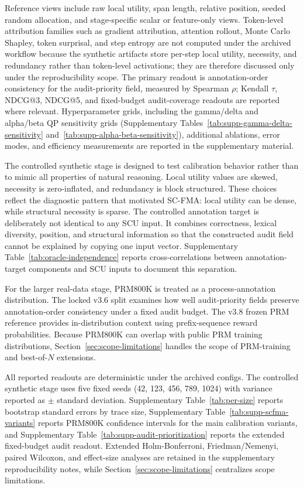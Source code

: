 \documentclass[a4paper,fleqn]{cas-sc}
\begin{document}
Reference views include raw local utility, span length, relative position, seeded random allocation, and stage-specific scalar or feature-only views. Token-level attribution families such as gradient attribution, attention rollout, Monte Carlo Shapley, token surprisal, and step entropy are not computed under the archived workflow because the synthetic artifacts store per-step local utility, necessity, and redundancy rather than token-level activations; they are therefore discussed only under the reproducibility scope. The primary readout is annotation-order consistency for the audit-priority field, measured by Spearman $\rho$; Kendall $\tau$, NDCG@3, NDCG@5, and fixed-budget audit-coverage readouts are reported where relevant. Hyperparameter grids, including the gamma/delta and alpha/beta QP sensitivity grids (Supplementary Tables~\ref{tab:supp-gamma-delta-sensitivity} and~\ref{tab:supp-alpha-beta-sensitivity}), additional ablations, error modes, and efficiency measurements are reported in the supplementary material.

The controlled synthetic stage is designed to test calibration behavior rather than to mimic all properties of natural reasoning. Local utility values are skewed, necessity is zero-inflated, and redundancy is block structured. These choices reflect the diagnostic pattern that motivated SC-FMA: local utility can be dense, while structural necessity is sparse. The controlled annotation target is deliberately not identical to any SCU input. It combines correctness, lexical diversity, position, and structural information so that the constructed audit field cannot be explained by copying one input vector. Supplementary Table~\ref{tab:oracle-independence} reports cross-correlations between annotation-target components and SCU inputs to document this separation.

For the larger real-data stage, PRM800K is treated as a process-annotation distribution. The locked v3.6 split examines how well audit-priority fields preserve annotation-order consistency under a fixed audit budget. The v3.8 frozen PRM reference provides in-distribution context using prefix-sequence reward probabilities. Because PRM800K can overlap with public PRM training distributions, Section~\ref{sec:scope-limitations} handles the scope of PRM-training and best-of-$N$ extensions.

All reported readouts are deterministic under the archived configs. The controlled synthetic stage uses five fixed seeds (42, 123, 456, 789, 1024) with variance reported as $\pm$ standard deviation. Supplementary Table~\ref{tab:per-size} reports bootstrap standard errors by trace size, Supplementary Table~\ref{tab:supp-scfma-variants} reports PRM800K confidence intervals for the main calibration variants, and Supplementary Table~\ref{tab:supp-audit-prioritization} reports the extended fixed-budget audit readout. Extended Holm-Bonferroni, Friedman/Nemenyi, paired Wilcoxon, and effect-size analyses are retained in the supplementary reproducibility notes, while Section~\ref{sec:scope-limitations} centralizes scope limitations.
\end{document}
